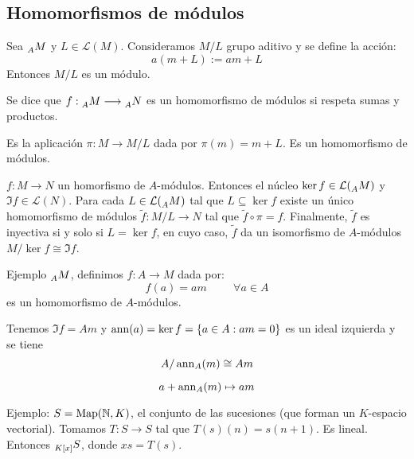 \subsection{Homomorfismos de módulos}

\begin{prop}
  Sea \(\prescript{}{A}{M}\) y \(L\in\mathcal{L}(M)\).
  Consideramos \(M/L\) grupo aditivo y se define la acción:
  \[
    a(m+L):=am+L
  \]
  Entonces \(M/L\) es un módulo.
\end{prop}

\begin{df}
  Se dice que
  \(f:\prescript{}{A}{M}\longrightarrow \prescript{}{A}{N}\)
  es un homomorfismo de módulos si respeta sumas y productos.
\end{df}

\begin{df}
  Es la aplicación \(\pi:M\longrightarrow M/L\) dada por
  \(\pi(m)=m+L\). Es un homomorfismo de módulos.
\end{df}

\begin{teo}
  \(f:M\longrightarrow N\) un homorfismo de \(A\)-módulos. Entonces
  el núcleo \(\ker f\in\mathcal{L}(\prescript{}{A}{M})\) y
  \(\Im f\in\mathcal{L}(N)\). Para cada \(L\in\mathcal{L}
  (\prescript{}{A}{M})\) tal que \(L\subseteq \ker f\) existe
  un único homomorfismo de módulos \(\tilde{f}:M/L\longrightarrow N\)
  tal que \(\tilde{f}\circ\pi=f\). Finalmente, \(\tilde{f}\) es
  inyectiva si y solo si \(L=\ker f\), en cuyo caso, \(\tilde{f}\)
  da un isomorfismo de \(A\)-módulos
  \(M/\ker f\cong \Im f\).
\end{teo}

Ejemplo \(\prescript{}{A}{M}\), definimos \(f:A\longrightarrow M\)
dada por:
\[
  f(a)=am\hspace{1cm} \forall a \in A
\]
es un homomorfismo de \(A\)-módulos.

Tenemos \(\Im f = Am\) y
\(\operatorname{ann}(a)=\ker f=\{a\in A: am=0\}\) es un ideal izquierda y se tiene
\[
  A/\operatorname{ann}_A(m)\cong Am
\]

\[
  a+\operatorname{ann}_A(m)\mapsto am
\]

Ejemplo: \(S=\operatorname{Map}(\mathbb{N},K)\), el conjunto de las sucesiones (que forman
un \(K\)-espacio vectorial). Tomamos \(T:S\longrightarrow S\)
tal que \(T(s)(n)=s(n+1)\). Es lineal. Entonces
\(\prescript{}{K[x]}{S}\), donde \(xs=T(s)\).

